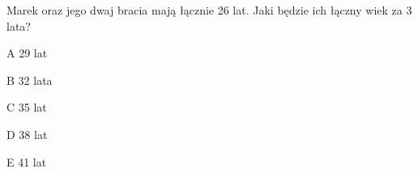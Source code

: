 \begin{tresc}
Marek oraz jego dwaj bracia mają łącznie 26 lat. Jaki będzie ich łączny wiek za 3 lata?
\end{tresc}
\begin{wariant}{A} 29 lat \end{wariant}
\begin{wariant}{B} 32 lata \end{wariant}
\begin{wariant}{C} 35 lat \end{wariant}
\begin{wariant}{D} 38 lat \end{wariant}
\begin{wariant}{E} 41 lat \end{wariant}

